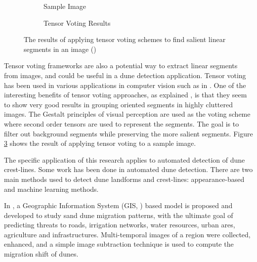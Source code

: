\begin{figure}
	\centering
	\begin{subfigure}{0.35\textwidth}
		\centering
		\caption{ Sample Image }
		\label{fig:tensor_voting_input}
	\end{subfigure}
	\begin{subfigure}{0.35\textwidth}
		\centering
		\caption{ Tensor Voting Results }
		\label{fig:tensor_voting_output}
	\end{subfigure}
	\caption{ The results of applying tensor voting schemes to find salient linear segments in an image (\cite{2009_tensor_voting_cluttered_backgrounds}) }
	\label{fig:tensor_voting_results}
\end{figure}

Tensor voting frameworks are also a potential way to extract linear segments from images, and could be useful in a dune detection application. Tensor voting has been used in various applications in computer vision such as in \cite{2006_tensor_voting_video_repairing,2005_tensor_voting_image_correction,2006_tensor_voting_stereo_monocular,2005_tensor_voting_visual_motion_analysis,2001_tensor_voting_epipolar_geometry}. One of the interesting benefits of tensor voting approaches, as explained \cite{2009_tensor_voting_cluttered_backgrounds}, is that they seem to show very good results in grouping oriented segments in highly cluttered images. The Gestalt principles of visual perception are used as the voting scheme where second order tensors are used to represent the segments. The goal is to filter out background segments while preserving the more salient segments. Figure \ref{fig:tensor_voting_results} shows the result of applying tensor voting to a sample image.

The specific application of this research applies to automated detection of dune crest-lines. Some work has been done in automated dune detection. There are two main methods used to detect dune landforms and crest-lines: appearance-based and machine learning methods.

In \cite{2012_automated_extraction_sand_dunes_egypt}, a Geographic Information System (GIS, \cite{gis_article}) based model is proposed and developed to study sand dune migration patterns, with the ultimate goal of predicting threats to roads, irrigation networks, water resources, urban ares, agriculture and infrastructures. Multi-temporal images of a region were collected, enhanced, and a simple image subtraction technique is used to compute the migration shift of dunes.

